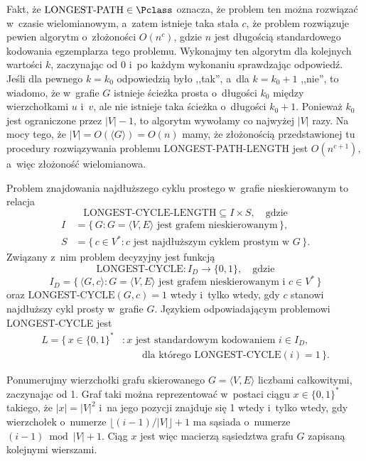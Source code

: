 
\exercise %
Fakt, że $\text{LONGEST-PATH}\in\Pclass$ oznacza, że problem ten można rozwiązać w~czasie wielomianowym, a~zatem istnieje taka stała $c$, że problem rozwiązuje pewien algorytm o~złożoności $O(n^c)$, gdzie $n$ jest długością standardowego kodowania egzemplarza tego problemu.
Wykonajmy ten algorytm dla kolejnych wartości $k$, zaczynając od 0 i~po każdym wykonaniu sprawdzając odpowiedź.
Jeśli dla pewnego $k=k_0$ odpowiedzią było ,,tak'', a~dla $k=k_0+1$ ,,nie'', to wiadomo, że w~grafie $G$ istnieje ścieżka prosta o~długości $k_0$ między wierzchołkami $u$ i~$v$, ale nie istnieje taka ścieżka o~długości $k_0+1$.
Ponieważ $k_0$ jest ograniczone przez $|V|-1$, to algorytm wywołamy co najwyżej $|V|$ razy.
Na mocy tego, że $|V|=O(\langle G\rangle)=O(n)$ mamy, że złożonością przedstawionej tu procedury rozwiązywania problemu LONGEST-PATH-LENGTH jest $O(n^{c+1})$, a~więc złożoność wielomianowa.

\exercise %
Problem znajdowania najdłuższego cyklu prostego w~grafie nieskierowanym to relacja
\[
	\text{LONGEST-CYCLE-LENGTH}\subseteq I\times S, \quad \text{gdzie}
\]
\begin{align*}
	I &= \bigl\{\,G:G=\langle V,E\rangle\text{ jest grafem nieskierowanym}\,\bigr\}, \\
	S &= \bigl\{\,c\in V^*\!:c\text{ jest najdłuższym cyklem prostym w~$G$}\,\bigr\}.
\end{align*}
Związany z~nim problem decyzyjny jest funkcją
\[
	\text{LONGEST-CYCLE}\colon I_D\to\{0,1\}, \quad \text{gdzie}
\]
\[
	I_D = \bigl\{\,\langle G,c\rangle:G=\langle V,E\rangle\text{ jest grafem nieskierowanym i~}c\in V^*\,\bigr\}
\]
oraz $\text{LONGEST-CYCLE}(G,c)=1$ wtedy i~tylko wtedy, gdy $c$ stanowi najdłuższy cykl prosty w~grafie $G$.
Językiem odpowiadającym problemowi LONGEST-CYCLE jest
\[
	\begin{split}
		L = \bigl\{\,x\in\{0,1\}^*\!&:x\text{ jest standardowym kodowaniem $i\in I_D$,} \\
		&\qquad \text{dla którego }\text{LONGEST-CYCLE}(i)=1\,\bigr\}.
	\end{split}
\]

\exercise %
Ponumerujmy wierzchołki grafu skierowanego $G=\langle V,E\rangle$ liczbami całkowitymi, zaczynając od 1.
Graf taki można reprezentować w~postaci ciągu $x\in\{0,1\}^*$ takiego, że $|x|=|V|^2$ i~na  jego pozycji znajduje się 1 wtedy i~tylko wtedy, gdy wierzchołek o~numerze $\lfloor(i-1)/|V|\rfloor+1$ ma sąsiada o~numerze $(i-1)\bmod|V|+1$.
Ciąg $x$ jest więc macierzą sąsiedztwa grafu $G$ zapisaną kolejnymi wierszami.

